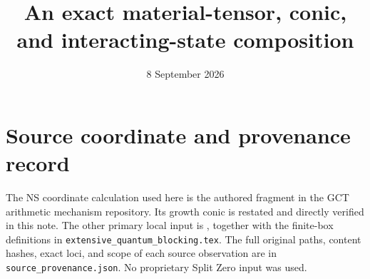 \documentclass[10pt]{article}
\title{An exact material-tensor, conic, and interacting-state composition}
\author{}
\date{8 September 2026}
\begin{document}
\maketitle

\appendix
\section{Source coordinate and provenance record}
\label{sec:ns-conic-transport}
The NS coordinate calculation used here is the authored fragment
 in the
GCT arithmetic mechanism repository. Its growth conic is restated
and directly verified in this note. The other primary local input is
,
together with the finite-box
definitions in \texttt{extensive\_quantum\_blocking.tex}.
The full original paths, content hashes, exact loci, and scope of
each source observation are in \texttt{source\_provenance.json}.
No proprietary Split Zero input was used.
\end{document}
